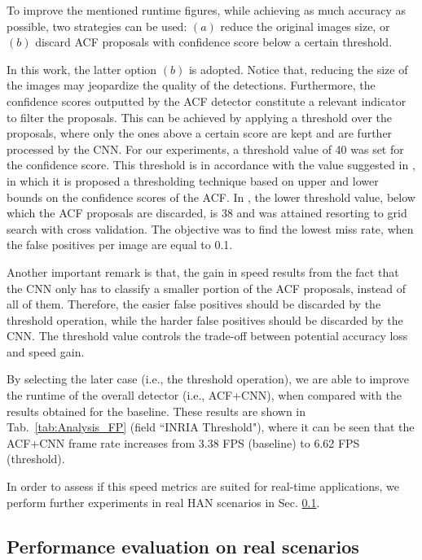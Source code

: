 \documentclass[5p,time]{elsarticle}
\begin{document}
To improve the mentioned runtime figures, while achieving as much accuracy as possible, two strategies can be used: $(a)$ reduce the original images size, or $(b)$ discard ACF proposals with confidence score below a certain threshold.

In this work, the latter option $(b)$ is adopted. Notice that, reducing the size of the images may jeopardize the quality of the detections. Furthermore, the confidence scores outputted by the ACF detector constitute a relevant indicator to filter the proposals. This can be achieved by applying a threshold over the proposals, where only the ones above a certain score are kept and are further processed by the CNN. For our experiments, a threshold value of 40 was set for the confidence score. This threshold is in accordance with the value suggested in \cite{VermaWICCV2015}, in which it is proposed a thresholding technique based on upper and lower bounds on the confidence scores of the ACF. In \cite{VermaWICCV2015}, the lower threshold value, below which the ACF proposals are discarded, is 38 and was attained resorting to grid search with cross validation. The objective was to find the lowest miss rate, when the false positives per image are equal to 0.1.

Another important remark is that, the gain in speed results from the fact that the CNN only has to classify a smaller portion of the ACF proposals, instead of all of them. Therefore, the easier false positives should be discarded by the threshold operation, while the harder false positives should be discarded by the CNN. The threshold value controls the trade-off between potential accuracy loss and speed gain.

By selecting the later case (i.e., the threshold operation), we are able to improve the runtime of the overall detector (i.e., ACF+CNN), when compared with the results obtained for the baseline. These results are shown in Tab.~\ref{tab:Analysis_FP} (field ``INRIA Threshold"), where it can be seen that the ACF+CNN frame rate increases from 3.38 FPS (baseline) to 6.62 FPS (threshold).

In order to assess if this speed metrics are suited for real-time applications, we perform further experiments in real HAN scenarios in Sec. \ref{sec:Results-CNN-Corridor-MBOT}.

\subsection{Performance evaluation on real scenarios}\label{sec:Results-CNN-Corridor-MBOT}
\end{document}
